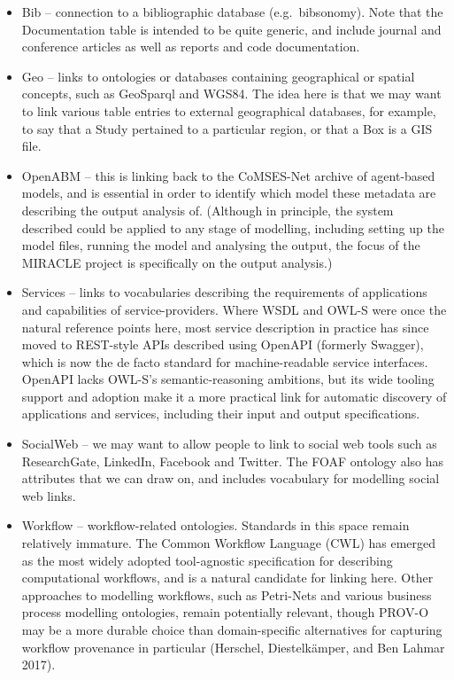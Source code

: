 \begin{itemize}
\item
  Bib -- connection to a bibliographic database (e.g.~bibsonomy). Note
  that the Documentation table is intended to be quite generic, and
  include journal and conference articles as well as reports and code
  documentation.
\item
  Geo -- links to ontologies or databases containing geographical or
  spatial concepts, such as GeoSparql and WGS84. The idea here is that
  we may want to link various table entries to external geographical
  databases, for example, to say that a Study pertained to a particular
  region, or that a Box is a GIS file.
\item
  OpenABM -- this is linking back to the CoMSES-Net archive of
  agent-based models, and is essential in order to identify which model
  these metadata are describing the output analysis of. (Although in
  principle, the system described could be applied to any stage of
  modelling, including setting up the model files, running the model and
  analysing the output, the focus of the MIRACLE project is specifically
  on the output analysis.)
\item
  Services -- links to vocabularies describing the requirements of
  applications and capabilities of service-providers. Where WSDL and
  OWL-S were once the natural reference points here, most service
  description in practice has since moved to REST-style APIs described
  using OpenAPI (formerly Swagger), which is now the de facto standard
  for machine-readable service interfaces. OpenAPI lacks OWL-S's
  semantic-reasoning ambitions, but its wide tooling support and
  adoption make it a more practical link for automatic discovery of
  applications and services, including their input and output
  specifications.
\item
  SocialWeb -- we may want to allow people to link to social web tools
  such as ResearchGate, LinkedIn, Facebook and Twitter. The FOAF
  ontology also has attributes that we can draw on, and includes
  vocabulary for modelling social web links.
\item
  Workflow -- workflow-related ontologies. Standards in this space
  remain relatively immature. The Common Workflow Language (CWL) has
  emerged as the most widely adopted tool-agnostic specification for
  describing computational workflows, and is a natural candidate for
  linking here. Other approaches to modelling workflows, such as
  Petri-Nets and various business process modelling ontologies, remain
  potentially relevant, though PROV-O may be a more durable choice than
  domain-specific alternatives for capturing workflow provenance in
  particular (Herschel, Diestelkämper, and Ben Lahmar 2017).
\end{itemize}

